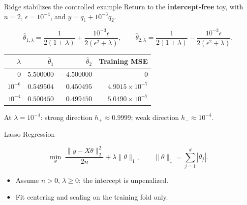 \begin{frame}{Ridge stabilizes the controlled example}
\small
Return to the \textbf{intercept-free} toy, with $n=2$,
$\epsilon=10^{-4}$, and $y=q_1+10^{-3}q_2$.
\begin{definitionbox}
\[
 \widehat \theta_{1,\lambda}=\frac{1}{2(1+\lambda)}
 +\frac{10^{-3}\epsilon}{2(\epsilon^2+\lambda)},\qquad
 \widehat \theta_{2,\lambda}=\frac{1}{2(1+\lambda)}
 -\frac{10^{-3}\epsilon}{2(\epsilon^2+\lambda)}.
\]
\end{definitionbox}
\small
{\centering
\begin{tabular}{@{}rrrr@{}}
\toprule
$\lambda$ & $\widehat \theta_1$ & $\widehat \theta_2$ & Training MSE\\\midrule
$0$ & $5.500000$ & $-4.500000$ & $0$\\
$10^{-6}$ & $0.549504$ & $0.450495$ & $4.9015\times10^{-7}$\\
$10^{-4}$ & $0.500450$ & $0.499450$ & $5.0490\times10^{-7}$\\\bottomrule
\end{tabular}
\par}
At $\lambda=10^{-4}$: strong direction $h_+\approx0.9999$;
weak direction $h_-\approx10^{-4}$.
\end{frame}



\begin{frame}{Lasso Regression}
\begin{definitionbox}\[
\min_{\theta}\;\frac{\|y-X\theta\|_2^2}{2n}+\lambda\|\theta\|_1,
\qquad \|\theta\|_1=\sum_{j=1}^d|\theta_j|.
\]\end{definitionbox}
\small\begin{itemize}\setlength{\itemsep}{9pt}
\item Assume $n>0$, $\lambda\geq0$; the intercept is unpenalized.
\item Fit centering and scaling on the training fold only.
\end{itemize}
\end{frame}

